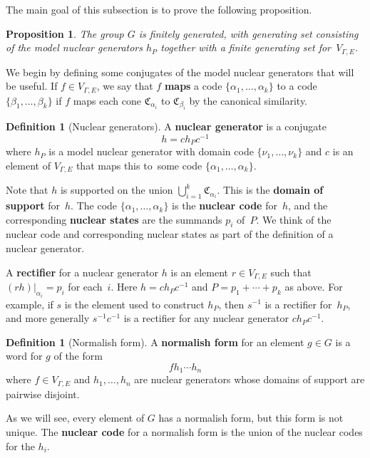 \documentclass[11pt,letterpaper]{amsart}
\newtheorem{proposition}[theorem]{Proposition}
\theoremstyle{definition}
\newtheorem{definition}[theorem]{Definition}
\newcommand{\newword}[1]{\textbf{#1}}
\newcommand{\C}{\mathfrak{C}}
\begin{document}
The main goal of this subsection is to prove the following proposition.

\begin{proposition}\label{prop:GFinitelyGenerated}
The group $G$ is finitely generated, with generating set consisting of the model nuclear generators $h_P$ together with a finite generating set for~$V_{\Gamma,E}$.
\end{proposition}

We begin by defining some conjugates of the model nuclear generators that will be useful.  If $f\in V_{\Gamma,E}$, we say that $f$ \newword{maps} a code $\{\alpha_1,\ldots,\alpha_k\}$ to a code $\{\beta_1,\ldots,\beta_k\}$ if $f$ maps each cone $\C_{\alpha_i}$ to $\C_{\beta_i}$ by the canonical similarity.

\begin{definition}[Nuclear generators]
A \newword{nuclear generator} is a conjugate
\[
h = ch_Pc^{-1}
\]
where $h_P$ is a model nuclear generator with domain code $\{\nu_1,\ldots,\nu_k\}$ and $c$ is an element of $V_{\Gamma,E}$ that maps this to\ some code $\{\alpha_1,\ldots,\alpha_k\}$.
\end{definition}

Note that $h$ is supported on the union $\bigcup_{i=1}^k \C_{\alpha_i}$.  This is the \newword{domain of support} for~$h$.  The code $\{\alpha_1,\ldots,\alpha_k\}$ is the \newword{nuclear code} 
for~$h$, and the corresponding \newword{nuclear states} are the summands $p_i$ of~$P$.  We think of the nuclear code and corresponding nuclear states as part of the definition of a nuclear generator.

A \newword{rectifier} for a nuclear generator $h$ is an element $r\in V_{\Gamma,E}$ such that $(rh)|_{\alpha_i}=p_i$ for each~$i$. Here $h=ch_P c^{-1}$ and $P=p_1+\cdots+p_k$ as above. For example, if $s$ is the element used to construct $h_P$, then $s^{-1}$ is a rectifier for~$h_P$, and more generally $s^{-1}c^{-1}$ is a rectifier for any nuclear generator $ch_Pc^{-1}$.

\begin{definition}[Normalish form]\label{def:normalish}
A \newword{normalish form} for an element $g\in G$ is a word for $g$ of the form
\[
fh_1\cdots h_n
\]
where $f\in V_{\Gamma,E}$ and $h_1,\ldots,h_n$ are nuclear generators whose domains of support are pairwise disjoint.
\end{definition}

As we will see, every element of $G$ has a normalish form, but this form is not unique.  The \newword{nuclear code} for a normalish form is the union of the nuclear codes for the $h_i$.
\end{document}
